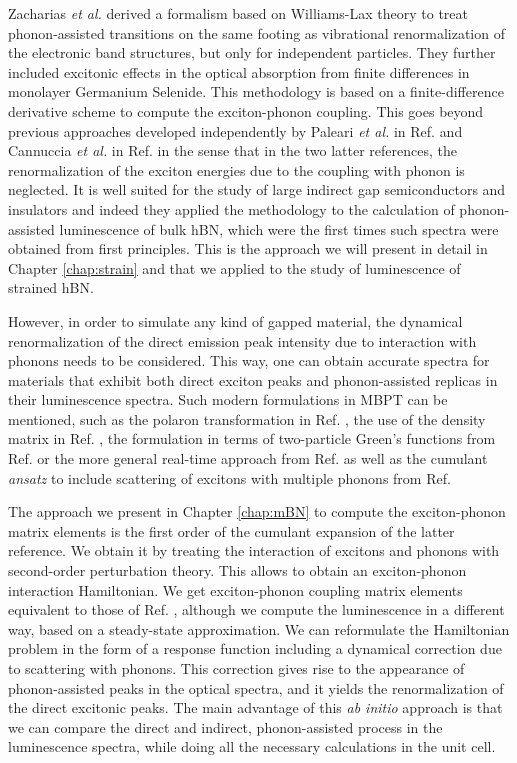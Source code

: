 Zacharias \textit{et al.} derived a formalism based on Williams-Lax theory\cite{williams1951theoretical,lax1952franck} to treat phonon-assisted transitions on the same footing as vibrational renormalization of the electronic band structures, but only for independent particles.\cite{zacharias2016one} They further included excitonic effects in the optical absorption from finite differences \cite{huang2021exciton} in monolayer Germanium Selenide. This methodology is based on a finite-difference derivative scheme to compute the exciton-phonon coupling. This goes beyond previous approaches developed independently by Paleari \textit{et al.} in Ref. \cite{paleari2019exciton} and Cannuccia \textit{et al.} in Ref. \cite{cannuccia2019theory} in the sense that in the two latter references, the renormalization of the exciton energies due to the coupling with phonon is neglected. It is well suited for the study of large indirect gap semiconductors and insulators and indeed they applied the methodology to the calculation of phonon-assisted luminescence of bulk hBN, which were the first times such spectra were obtained from first principles. This is the approach we will present in detail in Chapter \ref{chap:strain} and that we applied to the study of luminescence of strained hBN. 

However, in order to simulate any kind of gapped material, the dynamical renormalization of the direct emission peak intensity due to interaction with phonons needs to be considered. This way, one can obtain accurate spectra for materials that exhibit both direct exciton peaks and phonon-assisted replicas in their luminescence spectra. Such modern formulations in \acrshort{MBPT} can be mentioned, such as the polaron transformation in Ref. \cite{feldtmann2009phonon}, the use of the density matrix in Ref. \cite{brem2020phonon}, the formulation in terms of two-particle Green's functions from Ref. \cite{antonius2017theory} or the more general real-time approach from Ref. \cite{paleari2022exciton} as well as the cumulant \textit{ansatz} to include scattering of excitons with multiple phonons from Ref. \cite{cudazzo2020first}

The approach we present in Chapter \ref{chap:mBN} to compute the exciton-phonon matrix elements is the first order of the cumulant expansion of the latter reference. We obtain it by treating the interaction of excitons and phonons with second-order perturbation theory. This allows to obtain an exciton-phonon interaction Hamiltonian. We get exciton-phonon coupling matrix elements equivalent to those of Ref. \cite{chen2020exciton}, although we compute the luminescence in a different way, based on a steady-state approximation.
We can reformulate the Hamiltonian problem in the form of a response function including a dynamical correction due to scattering with phonons. This correction gives rise to the appearance of phonon-assisted peaks in the optical spectra, and it yields the renormalization of the direct excitonic peaks. The main advantage of this \textit{ab initio} approach is that we can compare the direct and indirect, phonon-assisted process in the luminescence spectra, while doing all the necessary calculations in the unit cell.

